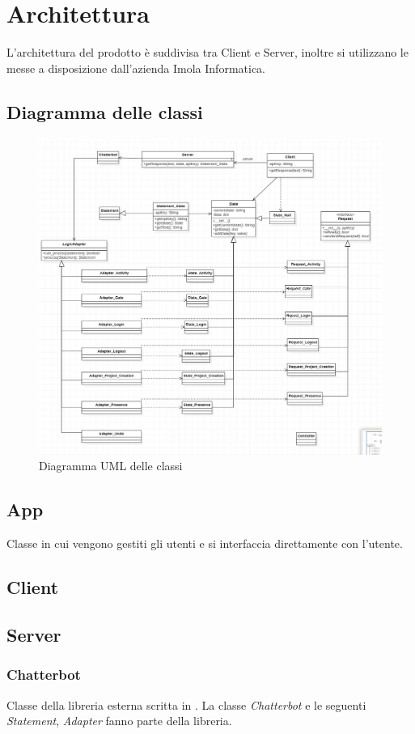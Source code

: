\section{Architettura}
L'architettura del prodotto è suddivisa tra Client e Server, inoltre si utilizzano le  messe a disposizione dall'azienda Imola Informatica.
\subsection{Diagramma delle classi}
	\begin{figure}[H]
	\centering\includegraphics[scale=0.80]{images/diagramma_classi.jpg}
    \caption{Diagramma UML delle classi}
	\end{figure}
\subsection{App} Classe in cui vengono gestiti gli utenti e si interfaccia direttamente con l'utente.
\subsection{Client}
\subsection{Server}
\subsubsection{Chatterbot} Classe della libreria esterna scritta in . La classe \textit{Chatterbot} e le seguenti \textit{Statement}, \textit{Adapter} fanno parte della libreria.
